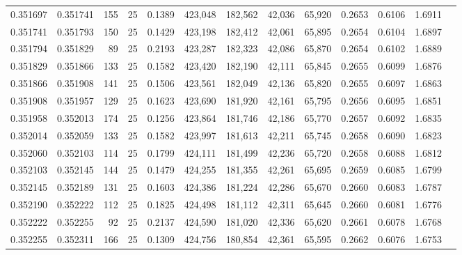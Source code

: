 \begin{tabular}{rrrrrrrrrrrrr}
0.351697 & 0.351741 &   155 &  25 &                                     0.1389 & 423,048 & 182,562 &  42,036 &  65,920 & 0.2653 & 0.6106 & 1.6911 \\
0.351741 & 0.351793 &   150 &  25 &                                     0.1429 & 423,198 & 182,412 &  42,061 &  65,895 & 0.2654 & 0.6104 & 1.6897 \\
0.351794 & 0.351829 &    89 &  25 &                                     0.2193 & 423,287 & 182,323 &  42,086 &  65,870 & 0.2654 & 0.6102 & 1.6889 \\
0.351829 & 0.351866 &   133 &  25 &                                     0.1582 & 423,420 & 182,190 &  42,111 &  65,845 & 0.2655 & 0.6099 & 1.6876 \\
0.351866 & 0.351908 &   141 &  25 &                                     0.1506 & 423,561 & 182,049 &  42,136 &  65,820 & 0.2655 & 0.6097 & 1.6863 \\
0.351908 & 0.351957 &   129 &  25 &                                     0.1623 & 423,690 & 181,920 &  42,161 &  65,795 & 0.2656 & 0.6095 & 1.6851 \\
0.351958 & 0.352013 &   174 &  25 &                                     0.1256 & 423,864 & 181,746 &  42,186 &  65,770 & 0.2657 & 0.6092 & 1.6835 \\
0.352014 & 0.352059 &   133 &  25 &                                     0.1582 & 423,997 & 181,613 &  42,211 &  65,745 & 0.2658 & 0.6090 & 1.6823 \\
0.352060 & 0.352103 &   114 &  25 &                                     0.1799 & 424,111 & 181,499 &  42,236 &  65,720 & 0.2658 & 0.6088 & 1.6812 \\
0.352103 & 0.352145 &   144 &  25 &                                     0.1479 & 424,255 & 181,355 &  42,261 &  65,695 & 0.2659 & 0.6085 & 1.6799 \\
0.352145 & 0.352189 &   131 &  25 &                                     0.1603 & 424,386 & 181,224 &  42,286 &  65,670 & 0.2660 & 0.6083 & 1.6787 \\
0.352190 & 0.352222 &   112 &  25 &                                     0.1825 & 424,498 & 181,112 &  42,311 &  65,645 & 0.2660 & 0.6081 & 1.6776 \\
0.352222 & 0.352255 &    92 &  25 &                                     0.2137 & 424,590 & 181,020 &  42,336 &  65,620 & 0.2661 & 0.6078 & 1.6768 \\
0.352255 & 0.352311 &   166 &  25 &                                     0.1309 & 424,756 & 180,854 &  42,361 &  65,595 & 0.2662 & 0.6076 & 1.6753 \\

\end{tabular}
